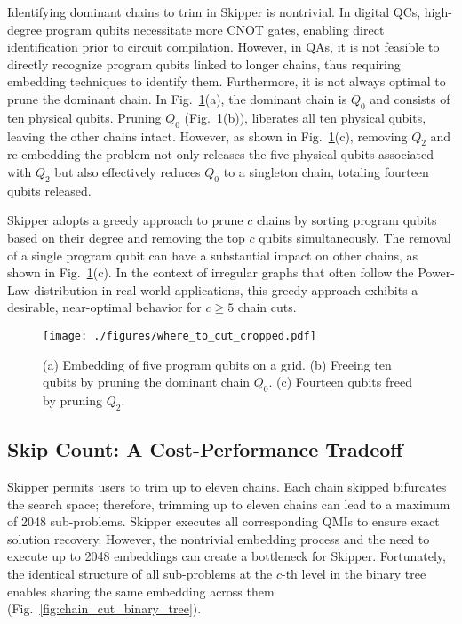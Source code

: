 Identifying dominant chains to trim in Skipper is nontrivial.
In digital QCs, high-degree program qubits necessitate more CNOT gates, enabling direct identification prior to circuit compilation. 
However, in QAs, it is not feasible to directly recognize program qubits linked to longer chains, thus requiring embedding techniques to identify them.
Furthermore, it is not always optimal to prune the dominant chain. 
In Fig.~\ref{fig:where_to_cut}(a), the dominant chain is $Q_0$ and consists of ten physical qubits. 
Pruning $Q_0$ (Fig.~\ref{fig:where_to_cut}(b)), liberates all ten physical qubits, leaving the other chains intact. 
However, as shown in Fig.~\ref{fig:where_to_cut}(c), removing $Q_2$ and re-embedding the problem not only releases the five physical qubits associated with $Q_2$ but also effectively reduces $Q_0$ to a singleton chain, totaling fourteen qubits released.


Skipper adopts a greedy approach to prune $c$ chains by sorting program qubits based on their degree and removing the top $c$ qubits simultaneously. The removal of a single program qubit can have a substantial impact on other chains, as shown in Fig.~\ref{fig:where_to_cut}(c). 
In the context of irregular graphs that often follow the Power-Law distribution in real-world applications, this greedy approach exhibits a desirable, near-optimal behavior for $c \geq 5$ chain cuts.

\begin{figure}[ht]
    \centering
    \texttt{[image: ./figures/where\_to\_cut\_cropped.pdf]}
    \caption{  
(a) Embedding of five program qubits on a grid. 
(b) Freeing ten qubits by pruning the dominant chain $Q_0$. 
(c) Fourteen qubits freed by pruning $Q_2$. 
    }
    \label{fig:where_to_cut} 
\end{figure}  



\subsection{Skip Count: A Cost-Performance Tradeoff}

Skipper permits users to trim up to eleven chains. 
Each chain skipped bifurcates the search space; therefore, trimming up to eleven chains can lead to a maximum of 2048 sub-problems. 
Skipper executes all corresponding QMIs to ensure exact solution recovery.
However, the nontrivial embedding process and the need to execute up to 2048 embeddings can create a bottleneck for Skipper. 
Fortunately, the identical structure of all sub-problems at the $c$-th level in the binary tree enables sharing the same embedding across them (Fig.~\ref{fig:chain_cut_binary_tree}).



